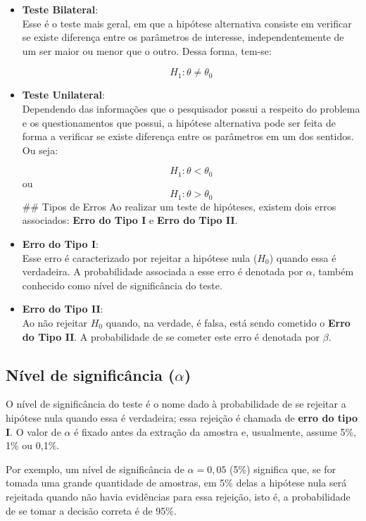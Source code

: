 \documentclass[
  portuguese,
]{estat/estat}
\begin{document}
\begin{itemize}
\item
  \textbf{Teste Bilateral}:\\
  Esse é o teste mais geral, em que a hipótese alternativa consiste em
  verificar se existe diferença entre os parâmetros de interesse,
  independentemente de um ser maior ou menor que o outro. Dessa forma,
  tem-se:

  \[ H_{1}: \theta \neq \theta_{0} \]
\item
  \textbf{Teste Unilateral}:\\
  Dependendo das informações que o pesquisador possui a respeito do
  problema e os questionamentos que possui, a hipótese alternativa pode
  ser feita de forma a verificar se existe diferença entre os parâmetros
  em um dos sentidos. Ou seja:

  \[ H_{1}: \theta < \theta_{0} \] ou \[ H_{1}: \theta > \theta_{0} \]
  \#\# Tipos de Erros Ao realizar um teste de hipóteses, existem dois
  erros associados: \textbf{Erro do Tipo I} e \textbf{Erro do Tipo II}.
\item
  \textbf{Erro do Tipo I}:\\
  Esse erro é caracterizado por rejeitar a hipótese nula (\(H_{0}\))
  quando essa é verdadeira. A probabilidade associada a esse erro é
  denotada por \(\alpha\), também conhecido como nível de significância
  do teste.
\item
  \textbf{Erro do Tipo II}:\\
  Ao não rejeitar \(H_{0}\) quando, na verdade, é falsa, está sendo
  cometido o \textbf{Erro do Tipo II}. A probabilidade de se cometer
  este erro é denotada por \(\beta\).
\end{itemize}

\subsection{\texorpdfstring{Nível de significância
(\(\alpha\))}{Nível de significância (\textbackslash alpha)}}\label{nuxedvel-de-significuxe2ncia-alpha}

O nível de significância do teste é o nome dado à probabilidade de se
rejeitar a hipótese nula quando essa é verdadeira; essa rejeição é
chamada de \textbf{erro do tipo I}. O valor de \(\alpha\) é fixado antes
da extração da amostra e, usualmente, assume 5\%, 1\% ou 0,1\%.

Por exemplo, um nível de significância de \(\alpha=0,05\) (5\%)
significa que, se for tomada uma grande quantidade de amostras, em 5\%
delas a hipótese nula será rejeitada quando não havia evidências para
essa rejeição, isto é, a probabilidade de se tomar a decisão correta é
de 95\%.
\end{document}
